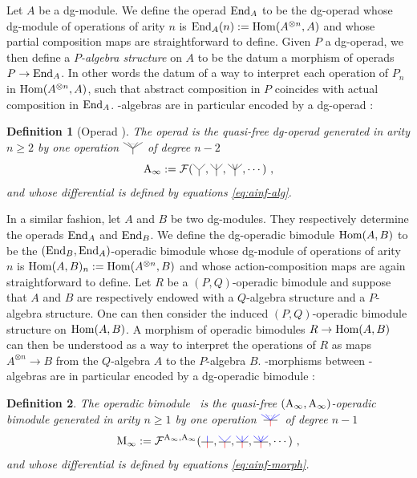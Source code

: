 \documentclass[twoside, 12pt]{amsart}
\newtheorem{definition}{Definition}[section]
\theoremstyle{remark}
\begin{document}
Let $A$ be a dg-module. We define the operad $\mathrm{End}_A$ to be the dg-operad whose dg-module of operations of arity $n$ is $\mathrm{End}_A(n) := \mathrm{Hom} (A^{\otimes n},A)$ and whose partial composition maps are straightforward to define.
Given $P$ a dg-operad, we then define a \emph{$P$-algebra structure} on $A$ to be the datum a morphism of operads $P \rightarrow \mathrm{End}_A$. In other words the datum of a way to interpret each operation of $P_n$ in $\mathrm{Hom} (A^{\otimes n},A)$, such that abstract composition in $P$ coincides with actual composition in $\mathrm{End}_A$.
\Ainf -algebras are in particular encoded by a dg-operad : 

\begin{definition}[Operad \Ainf]
The \emph{operad \Ainf} is the quasi-free dg-operad generated in arity $n \geqslant 2$ by one operation $\arbreop{0.15}$ of degree $n-2$ 
\[ \Ainf := \mathcal{F}( \arbreopdeux , \arbreoptrois, \arbreopquatre , \cdots ) \ , \]
and whose differential is defined by equations \ref{eq:ainf-alg}.
\end{definition}

In a similar fashion, let $A$ and $B$ be two dg-modules. They respectively determine the operads $\mathrm{End}_A$ and $ \mathrm{End}_B$. We define the dg-operadic bimodule $\mathrm{Hom} (A ,B)$ to be the $(\mathrm{End}_B , \mathrm{End}_A)$-operadic bimodule whose dg-module of operations of arity $n$ is $ \mathrm{Hom} (A ,B)_n := \mathrm{Hom} (A^{\otimes n},B)$ and whose action-composition maps are again straightforward to define.
Let $R$ be a $(P,Q)$-operadic bimodule and suppose that $A$ and $B$ are respectively endowed with a $Q$-algebra structure and a $P$-algebra structure. One can then consider the induced $(P,Q)$-operadic bimodule structure on $\mathrm{Hom} (A ,B)$. A morphism of operadic bimodules $R \rightarrow \mathrm{Hom} (A ,B)$ can then be understood as a way to interpret the operations of $R$ as maps $A^{\otimes n} \rightarrow B$ from the $Q$-algebra $A$ to the $P$-algebra $B$. \Ainf -morphisms between \Ainf -algebras are in particular encoded by a dg-operadic bimodule :

\begin{definition}
The operadic bimodule \Minf\ is the quasi-free $(\mathrm{A}_\infty ,\mathrm{A}_\infty )$-operadic bimodule generated in arity $n \geqslant 1$ by one operation $\arbreopmorph{0.15}$ of degree $n-1$ 
\[ \Minf :=  \mathcal{F}^{\Ainf , \Ainf}(\arbreopunmorph , \arbreopdeuxmorph , \arbreoptroismorph , \arbreopquatremorph , \cdots ) \ , \]
and whose differential is defined by equations \ref{eq:ainf-morph}.
\end{definition}
\end{document}
